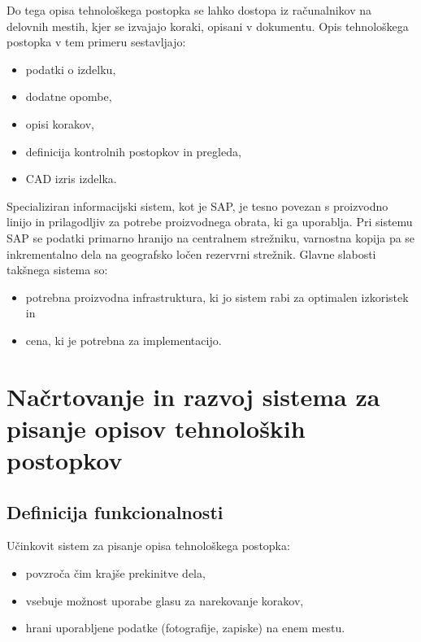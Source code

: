 \documentclass[a4paper, 12pt]{book}
\begin{document}
Do tega opisa tehnološkega postopka se lahko dostopa iz računalnikov na delovnih mestih, kjer se izvajajo koraki, opisani v dokumentu.
Opis tehnološkega postopka v tem primeru sestavljajo:
\begin{itemize}
	\item podatki o izdelku,
	\item dodatne opombe,
	\item opisi korakov,
	\item definicija kontrolnih postopkov in pregleda, 
	\item CAD izris izdelka.
\end{itemize}

Specializiran informacijski sistem, kot je SAP, je tesno povezan s proizvodno linijo in prilagodljiv za potrebe proizvodnega obrata, ki ga uporablja.
Pri sistemu SAP se podatki primarno hranijo na centralnem strežniku, varnostna kopija pa se inkrementalno dela na geografsko ločen rezervrni strežnik.
Glavne slabosti takšnega sistema so:
\begin{itemize}
	\item potrebna proizvodna infrastruktura, ki jo sistem rabi za optimalen izkoristek in
	\item cena, ki je potrebna za implementacijo.
\end{itemize}




\chapter{Načrtovanje in razvoj sistema za pisanje opisov tehnoloških postopkov}

\section{Definicija funkcionalnosti}

Učinkovit sistem za pisanje opisa tehnološkega postopka:
\begin{itemize}
	\item povzroča čim krajše prekinitve dela,
	\item vsebuje možnost uporabe glasu za narekovanje korakov,
	\item hrani uporabljene podatke (fotografije, zapiske) na enem mestu.
\end{itemize}
\end{document}
